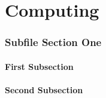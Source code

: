 \documentclass[./FDA_document_template.tex]{subfiles}
\begin{document}
\renewcommand{\onlyinsubfile}[1]{#1}
\renewcommand{\notinsubfile}[1]{}
 
\setcounter{part}{4}
\pagestyle{Standard}

\part{Computing}
 
 
 
 \section{Subfile Section One}

\lipsum[1]

\subsection{First Subsection}

\lipsum[2]

\subsection{Second Subsection}

\lipsum[3]

\bigskip
 
\end{document}
